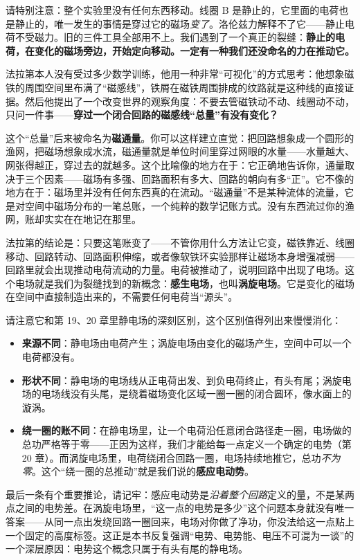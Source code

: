 请特别注意：整个实验里没有任何东西移动。线圈 B 是静止的，它里面的电荷也是静止的，唯一发生的事情是穿过它的磁场\emph{变了}。洛伦兹力解释不了它——静止电荷不受磁力。旧的三件工具全部用不上。我们遇到了一个真正的裂缝：\textbf{静止的电荷，在变化的磁场旁边，开始定向移动。一定有一种我们还没命名的力在推动它。}


法拉第本人没有受过多少数学训练，他用一种非常“可视化”的方式思考：他想象磁铁的周围空间里布满了“磁感线”，铁屑在磁铁周围排成的纹路就是这种线的直接证据。然后他提出了一个改变世界的观察角度：不要去管磁铁动不动、线圈动不动，只问一件事——\textbf{穿过一个闭合回路的磁感线“总量”有没有变化？}

这个“总量”后来被命名为\textbf{磁通量}。你可以这样建立直觉：把回路想象成一个圆形的渔网，把磁场想象成水流，磁通量就是单位时间里穿过网眼的水量——水量越大、网张得越正，穿过去的就越多。这个比喻像的地方在于：它正确地告诉你，通量取决于三个因素——磁场有多强、回路面积有多大、回路的朝向有多“正”。它不像的地方在于：磁场里并没有任何东西真的在流动。“磁通量”不是某种流体的流量，它是对空间中磁场分布的一笔总账，一个纯粹的数学记账方式。没有东西流过你的渔网，账却实实在在地记在那里。

法拉第的结论是：只要这笔账变了——不管你用什么方法让它变，磁铁靠近、线圈移动、回路转动、回路面积伸缩，或者像软铁环实验那样让磁场本身增强减弱——回路里就会出现推动电荷流动的力量。电荷被推动了，说明回路中出现了电场。这个电场就是我们为裂缝找到的新概念：\textbf{感生电场}，也叫\textbf{涡旋电场}。它是变化的磁场在空间中直接制造出来的，不需要任何电荷当“源头”。

请注意它和第 19、20 章里静电场的深刻区别，这个区别值得列出来慢慢消化：

\begin{itemize}
\item \textbf{来源不同}：静电场由电荷产生；涡旋电场由变化的磁场产生，空间中可以一个电荷都没有。
\item \textbf{形状不同}：静电场的电场线从正电荷出发、到负电荷终止，有头有尾；涡旋电场的电场线没有头尾，是绕着磁场变化区域一圈一圈的闭合圆环，像水面上的漩涡。
\item \textbf{绕一圈的账不同}：在静电场里，让一个电荷沿任意闭合路径走一圈，电场做的总功严格等于零——正因为这样，我们才能给每一点定义一个确定的电势（第 20 章）。而涡旋电场里，电荷绕闭合回路一圈，电场持续地推它，总功\emph{不为零}。这个“绕一圈的总推动”就是我们说的\textbf{感应电动势}。
\end{itemize}

最后一条有个重要推论，请记牢：感应电动势是\emph{沿着整个回路}定义的量，不是某两点之间的电势差。在涡旋电场里，“这一点的电势是多少”这个问题本身就没有唯一答案——从同一点出发绕回路一圈回来，电场对你做了净功，你没法给这一点贴上一个固定的高度标签。这正是本书反复强调“电势、电势能、电压不可混为一谈”的一个深层原因：电势这个概念只属于有头有尾的静电场。

